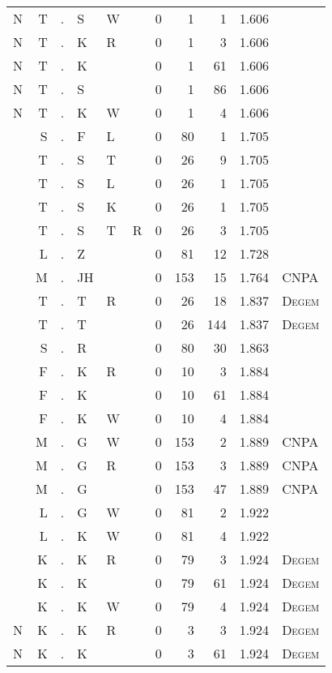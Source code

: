 \begin{longtable}{r@{ } r@{ } c@{ } l@{ } l@{ } l@{ } r r r r l }
N & T & . & S & W &   & 0 & 1 & 1 & 1.606 &  \\
N & T & . & K & R &   & 0 & 1 & 3 & 1.606 &  \\
N & T & . & K &   &   & 0 & 1 & 61 & 1.606 &  \\
N & T & . & S &   &   & 0 & 1 & 86 & 1.606 &  \\
N & T & . & K & W &   & 0 & 1 & 4 & 1.606 &  \\
  & S & . & F & L &   & 0 & 80 & 1 & 1.705 &  \\
  & T & . & S & T &   & 0 & 26 & 9 & 1.705 &  \\
  & T & . & S & L &   & 0 & 26 & 1 & 1.705 &  \\
  & T & . & S & K &   & 0 & 26 & 1 & 1.705 &  \\
  & T & . & S & T & R & 0 & 26 & 3 & 1.705 &  \\
  & L & . & Z &   &   & 0 & 81 & 12 & 1.728 &  \\
  & M & . & JH &   &   & 0 & 153 & 15 & 1.764 & \textsc{CNPA} \\
  & T & . & T & R &   & 0 & 26 & 18 & 1.837 & \textsc{Degem} \\
  & T & . & T &   &   & 0 & 26 & 144 & 1.837 & \textsc{Degem} \\
  & S & . & R &   &   & 0 & 80 & 30 & 1.863 &  \\
  & F & . & K & R &   & 0 & 10 & 3 & 1.884 &  \\
  & F & . & K &   &   & 0 & 10 & 61 & 1.884 &  \\
  & F & . & K & W &   & 0 & 10 & 4 & 1.884 &  \\
  & M & . & G & W &   & 0 & 153 & 2 & 1.889 & \textsc{CNPA} \\
  & M & . & G & R &   & 0 & 153 & 3 & 1.889 & \textsc{CNPA} \\
  & M & . & G &   &   & 0 & 153 & 47 & 1.889 & \textsc{CNPA} \\
  & L & . & G & W &   & 0 & 81 & 2 & 1.922 &  \\
  & L & . & K & W &   & 0 & 81 & 4 & 1.922 &  \\
  & K & . & K & R &   & 0 & 79 & 3 & 1.924 & \textsc{Degem} \\
  & K & . & K &   &   & 0 & 79 & 61 & 1.924 & \textsc{Degem} \\
  & K & . & K & W &   & 0 & 79 & 4 & 1.924 & \textsc{Degem} \\
N & K & . & K & R &   & 0 & 3 & 3 & 1.924 & \textsc{Degem} \\
N & K & . & K &   &   & 0 & 3 & 61 & 1.924 & \textsc{Degem} \\

\end{longtable}
